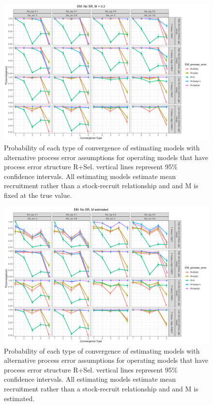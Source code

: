 \documentclass[
  12pt,
]{article}
\begin{document}
\begin{landscape}
\begin{figure}
\caption{Probability of each type of convergence of estimating models with alternative process error assumptions for operating models that have process error structure R+Sel. vertical lines represent 95\% confidence intervals. All estimating models estimate mean recruitment rather than a stock-recruit relationship and and M is fixed at the true value.}\label{Sel_om_em_R_MF_convergence}
\begin{center}
\includegraphics[width = \textwidth]{Sel_om_p_convergence_meanR_M_fixed.png}
\end{center}
\end{figure}
\end{landscape}

\begin{landscape}
\begin{figure}
\caption{Probability of each type of convergence of estimating models with alternative process error assumptions for operating models that have process error structure R+Sel. vertical lines represent 95\% confidence intervals. All estimating models estimate mean recruitment rather than a stock-recruit relationship and and M is estimated.}\label{Sel_om_em_R_ME_convergence}
\begin{center}
\includegraphics[width = \textwidth]{Sel_om_p_convergence_meanR_M_estimated.png}
\end{center}
\end{figure}
\end{landscape}
\end{document}
